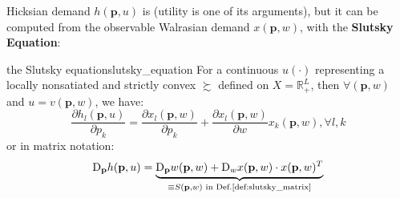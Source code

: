 \begin{figure}[h]
\end{figure}

Hicksian demand $h(\mathbf{p},u)$ is  (utility is one of its arguments), but it can be computed from the observable Walrasian demand $x(\mathbf{p},w)$, with the \textbf{Slutsky Equation}:
\begin{theorem}{the Slutsky equation}{slutsky_equation}
    For a continuous $u(\cdot)$ representing a locally nonsatiated and strictly convex $\succsim$ defined on $X=\mathbb{R}^L_+$, then $\forall (\mathbf{p},w)$ and $u=v(\mathbf{p},w)$, we have:
    $$ \frac{\partial h_l(\mathbf{p},u)}{\partial p_k} = \frac{\partial x_l(\mathbf{p},w)}{\partial p_k} +\frac{\partial x_l(\mathbf{p},w)}{\partial w}x_k(\mathbf{p},w), \forall l,k $$
    or in matrix notation:
    $$ \mathrm{D}_{\mathbf{p}} h(\mathbf{p},u) = \underbrace{\mathrm{D}_{\mathbf{p}} w(\mathbf{p},w)+\mathrm{D}_w x(\mathbf{p},w)\cdot x(\mathbf{p},w)^T}_{\equiv S(\mathbf{p},w) \text{ in Def.\ref{def:slutsky_matrix}}}$$
\end{theorem}

